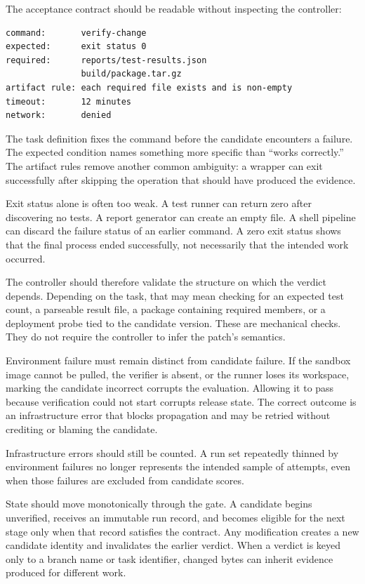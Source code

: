The acceptance contract should be readable without inspecting the controller:

\begin{verbatim}
command:       verify-change
expected:      exit status 0
required:      reports/test-results.json
               build/package.tar.gz
artifact rule: each required file exists and is non-empty
timeout:       12 minutes
network:       denied
\end{verbatim}

The task definition fixes the command before the candidate encounters a failure. The expected condition names something more specific than ``works correctly.'' The artifact rules remove another common ambiguity: a wrapper can exit successfully after skipping the operation that should have produced the evidence.

Exit status alone is often too weak. A test runner can return zero after discovering no tests. A report generator can create an empty file. A shell pipeline can discard the failure status of an earlier command. A zero exit status shows that the final process ended successfully, not necessarily that the intended work occurred.

The controller should therefore validate the structure on which the verdict depends. Depending on the task, that may mean checking for an expected test count, a parseable result file, a package containing required members, or a deployment probe tied to the candidate version. These are mechanical checks. They do not require the controller to infer the patch's semantics.

Environment failure must remain distinct from candidate failure. If the sandbox image cannot be pulled, the verifier is absent, or the runner loses its workspace, marking the candidate incorrect corrupts the evaluation. Allowing it to pass because verification could not start corrupts release state. The correct outcome is an infrastructure error that blocks propagation and may be retried without crediting or blaming the candidate.

Infrastructure errors should still be counted. A run set repeatedly thinned by environment failures no longer represents the intended sample of attempts, even when those failures are excluded from candidate scores.

State should move monotonically through the gate. A candidate begins unverified, receives an immutable run record, and becomes eligible for the next stage only when that record satisfies the contract. Any modification creates a new candidate identity and invalidates the earlier verdict. When a verdict is keyed only to a branch name or task identifier, changed bytes can inherit evidence produced for different work.

